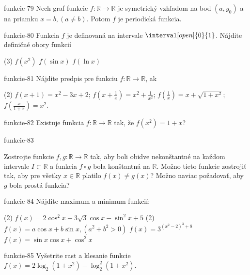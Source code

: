 \begin{defproblem}{funkcie-79}
Nech graf funkcie $f:\mathbb{R}\rightarrow\mathbb{R}$ je symetrický vzhľadom na
bod $(a,y_0)$ a na priamku $x=b,(a\neq b)$. Potom $f$ je periodická funkcia.
\end{defproblem}

\begin{defproblem}{funkcie-80}
Funkcia $f$ je definovaná na intervale $\interval[open]{0}{1}$. Nájdite
definičné obory funkcií
\begin{tasks}(3)
  \task $f(x^2)$
  \task $f(\sin x)$
  \task $f(\ln x)$
\end{tasks}
\end{defproblem}

\begin{defproblem}{funkcie-81}
Nájdite predpis pre funkciu $f:\mathbb{R}\rightarrow\mathbb{R}$, ak
\begin{tasks}(2)
  \task $f(x+1)=x^2-3x+2$;
  \task $f(x+\frac{1}{x})=x^2+\frac{1}{x^2}$;
  \task $f(\frac{1}{x})=x+\sqrt{1+x^2}$;
  \task $f(\frac{x}{1+x})=x^2$.
\end{tasks}
\end{defproblem}

\begin{defproblem}{funkcie-82}
Existuje funkcia $f:\mathbb{R}\rightarrow\mathbb{R}$ tak, že $f(x^2)=1+x$?
\end{defproblem}

\begin{defproblem}{funkcie-83}
\begin{tasks}
\task Zostrojte funkcie $f,g:\mathbb{R}\rightarrow\mathbb{R}$ tak, aby boli obidve nekonštantné na každom intervale $I\subset\mathbb{R}$ a funkcia $f\circ g$ bola konštantná na $\mathbb{R}$. Možno tieto funkcie zostrojiť tak, aby pre všetky $x\in\mathbb{R}$ platilo $f(x)\neq g(x)$?
\task Možno naviac požadovať, aby $g$ bola prostá funkcia?
\end{tasks}
\end{defproblem}

\begin{defproblem}{funkcie-84}
Nájdite maximum a minimum funkcií:
\begin{tasks}
  \task*(2) $f(x)=2\cos^2 x -3\sqrt{3}\cos x -\sin^2 x +5$
  \task*(2) $f(x)=a\cos x +b\sin x ,(a^2+b^2>0)$
  \task $f(x)=3^{(x^2-2)^3+8}$
  \task $f(x)=\sin x \cos x +\cos^2 x$
\end{tasks}
\end{defproblem}

\begin{defproblem}{funkcie-85}
Vyšetrite rast a klesanie funkcie $f(x)=2\log_2(1+x^2)-\log_2^2(1+x^2)$.
\end{defproblem}

